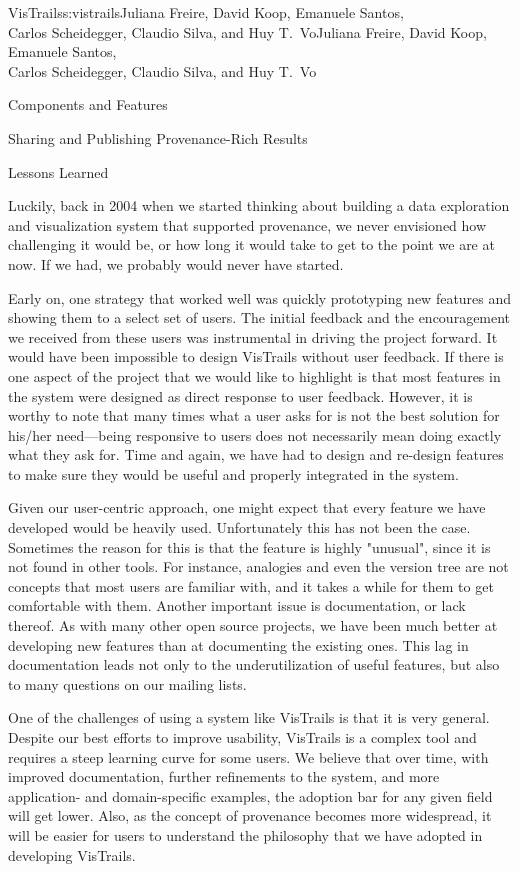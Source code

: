 \begin{aosachaptertoc}{VisTrails}{s:vistrails}{Juliana Freire, David Koop, Emanuele Santos, \\ Carlos Scheidegger, Claudio Silva, and Huy T.\ Vo}{Juliana Freire, David Koop, Emanuele Santos, \\ \hspace*{0.9cm} Carlos Scheidegger, Claudio Silva, and Huy T.\ Vo}
\begin{aosasect1}{Components and Features}
\begin{aosasect2}{Sharing and Publishing Provenance-Rich Results}
\end{aosasect2}

\end{aosasect1}

\begin{aosasect1}{Lessons Learned}

Luckily, back in 2004 when we started thinking about building a data
exploration and visualization system that supported provenance, we
never envisioned how challenging it would be, or how long it would
take to get to the point we are at now. If we had, we probably would
never have started.

Early on, one strategy that worked well was quickly prototyping new
features and showing them to a select set of users. The initial
feedback and the encouragement we received from these users was
instrumental in driving the project forward. It would have been
impossible to design VisTrails without user feedback. If there is one
aspect of the project that we would like to highlight is that most
features in the system were designed as direct response to user
feedback. However, it is worthy to note that many times what a user
asks for is not the best solution for his/her need---being responsive
to users does not necessarily mean doing exactly what they ask for.
Time and again, we have had to design and re-design features to make
sure they would be useful and properly integrated in the system.

Given our user-centric approach, one might expect that every feature
we have developed would be heavily used. Unfortunately this has not
been the case.  Sometimes the reason for this is that the feature is
highly "unusual", since it is not found in other tools. For instance,
analogies and even the version tree are not concepts that most users
are familiar with, and it takes a while for them to get comfortable
with them. Another important issue is documentation, or lack
thereof. As with many other open source projects, we have been much
better at developing new features than at documenting the existing
ones. This lag in documentation leads not only to the underutilization
of useful features, but also to many questions on our mailing lists.

One of the challenges of using a system like VisTrails is that it is
very general. Despite our best efforts to improve usability, VisTrails
is a complex tool and requires a steep learning curve for some
users. We believe that over time, with improved documentation, further
refinements to the system, and more application- and domain-specific
examples, the adoption bar for any given field will get lower. Also,
as the concept of provenance becomes more widespread, it will be
easier for users to understand the philosophy that we have adopted in
developing VisTrails.


\end{aosasect1}
\end{aosachaptertoc}
